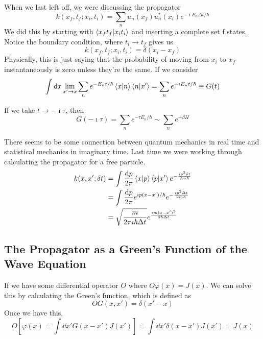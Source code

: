 \documentclass[a4paper,twoside,master.tex]{subfiles}
\begin{document}

When we last left off, we were discussing the propagator
\begin{equation}
    k(x_f, t_f; x_i, t_i) = \sum_n u_n(x_f) u_n^*(x_i) e^{- \imath E_n \Delta t / \hbar}
\end{equation}
We did this by starting with $\bra{x_f t_f}\ket{x_i t_i} $ and inserting a complete set f states. Notice the boundary condition, where $ t_i \to t_f $ gives us
\begin{equation}
    k(x_f, t_f; x_i, t_i) = \delta(x_i - x_f)
\end{equation}
Physically, this is just saying that the probability of moving from $ x_i $ to $ x_f $ instantaneously is zero unless they're the same. If we consider
\begin{equation}
    \int \dd{x} \lim_{x' \to x} \sum_n e^{-E_n t/ \hbar}\bra{x}\ket{n}\bra{n}\ket{x'} = \sum_n e^{- \imath E_n t / \hbar} \equiv G(t)
\end{equation}

If we take $ t \to - \imath \tau $, then
\begin{equation}
    G(- \imath \tau) = \sum_n e^{- \tau E_n / \hbar} \sim \sum_n e^{- \beta H}
\end{equation}

There seems to be some connection between quantum mechanics in real time and statistical mechanics in imaginary time. Last time we were working through calculating the propagator for a free particle.
\begin{align}
    k(x,x'; \delta t) &= \int \frac{\dd{p}}{2 \pi}\bra{x}\ket{p}\bra{p}\ket{x'} e^{- \frac{\imath p^2 \delta t}{2m \hbar}} \\
    &= \int \frac{\dd{p}}{2 \pi} e^{\imath p (x-x')/ \hbar} e^{- \frac{\imath p^2 \Delta t}{2m \hbar}} \\
    &= \sqrt{\frac{m}{2 \pi \imath \hbar \Delta t}} e^{\frac{\imath m (x-x')^2}{2 \hbar \Delta t}}
\end{align}

\subsection{The Propagator as a Green's Function of the Wave Equation}
\label{sub:the_propagator_as_a_green's_function_of_the_wave_equation}

If we have some differential operator $ O $ where $ O \varphi(x) = J(x) $. We can solve this by calculating the Green's function, which is defined as
\begin{equation}
    O G(x,x') = \delta(x'-x)
\end{equation}
Once we have this,
\begin{equation}
    O [\varphi(x) = \int \dd{x'} G(x-x') J(x')] = \int \dd{x'} \delta(x-x') J(x') = J(x)
\end{equation}
\end{document}
